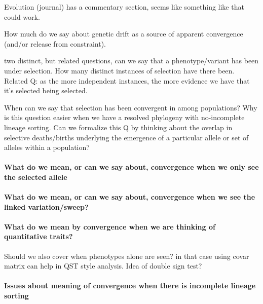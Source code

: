 
Evolution (journal) has a commentary section, seems like something like that could work.




How much do we say about genetic drift as a source of apparent convergence (and/or release from constraint).

two distinct, but related questions, can we say that a phenotype/variant has been under selection. How many distinct instances of selection have there been. 
Related Q: as the more independent instances, the more evidence we have that it's
selected being selected.  

When can we say that selection has been convergent in among populations?
Why is this question easier when we have a resolved phylogeny with
no-incomplete lineage sorting.
Can we formalize this Q by thinking about the overlap in selective deaths/births underlying the emergence of a particular allele or set of alleles within a population?


\paragraph{What do we mean, or can we say about, convergence when we only see the selected allele}

\paragraph{What do we mean, or can we say about, convergence when we see the linked variation/sweep?}

\paragraph{What do we mean by convergence when we are thinking of quantitative traits?}
Should we also cover when phenotypes alone are seen? in that case using covar matrix can help in QST style analysis.
Idea of double sign test?


\paragraph{Issues about meaning of convergence when there is incomplete lineage sorting} 

